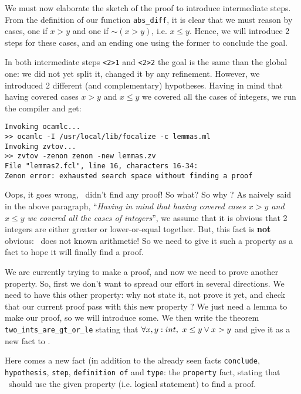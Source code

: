 \documentclass[11pt,a4paper,twoside,onecolumn,fullpage]{article}
\begin{document}
{\scriptsize
}

We must now elaborate the sketch of the proof to introduce
intermediate steps. From the definition of our function
\lstinline"abs_diff", it is clear that we must reason by cases, one if
$x > y$ and one if $\sim (x > y)$, i.e. $x \le y$. Hence, we will
introduce 2 steps for these cases, and an ending one using the former
to conclude the goal.

{\scriptsize
}

In both intermediate steps \lstinline"<2>1" and \lstinline"<2>2" the
goal is the same than the global one: we did not yet split it, changed
it by any refinement. However, we introduced 2 different (and
complementary) hypotheses.
Having in mind that having covered cases $x > y$
and  $x \le y$ we covered all the cases of integers, we run the
compiler and get:

{\scriptsize
\begin{verbatim}
Invoking ocamlc...
>> ocamlc -I /usr/local/lib/focalize -c lemmas.ml
Invoking zvtov...
>> zvtov -zenon zenon -new lemmas.zv
File "lemmas2.fcl", line 16, characters 16-34:
Zenon error: exhausted search space without finding a proof
\end{verbatim}}

Oops, it goes wrong, \zenon\ didn't find any proof! So what? So why ?
As naively said in the above paragraph, ``{\em Having in mind that having
covered cases $x > y$ and  $x \le y$ we covered all the cases of
integers}'', we assume that it is obvious that 2 integers are either
greater or lower-or-equal together. But, this fact is {\bf not}
obvious: \zenon\ does not known arithmetic! So we need to give it
such a property as a fact to hope it will finally find a proof.

\medskip
We are currently trying to make a proof, and now we need to prove
another property. So, first we don't want to spread our effort in
several directions. We need to have this other property: why not state
it, not prove it yet, and check that our current proof pass with this
new property ? We just need a lemma to make our proof, so we will
introduce some. We then write the theorem
\lstinline"two_ints_are_gt_or_le"
stating that $\forall x, y : int,\ x \le y \vee x > y$ and give it
as a new fact to \zenon.

Here comes a new fact  (in addition to the
already seen facts \lstinline"conclude", \lstinline"hypothesis",
\lstinline"step", \lstinline"definition of" and \lstinline"type": the
\lstinline"property" fact, sta\-ting that \zenon\ should use the given
property (i.e. logical statement) to find a proof.
\end{document}
